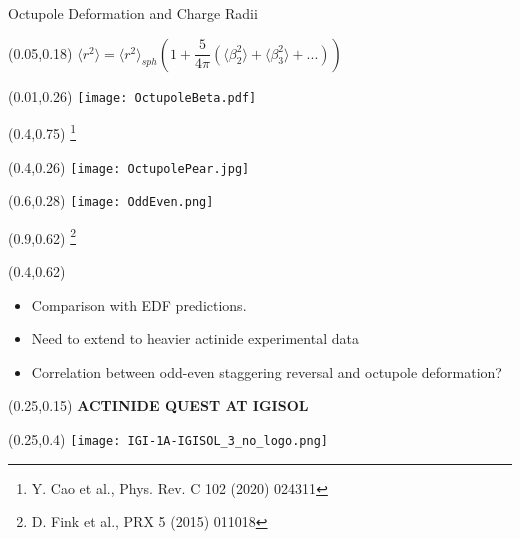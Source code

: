 \documentclass[10pt,aspectratio=169]{beamer}
\begin{document}
\begin{frame}{Octupole Deformation and Charge Radii}
	\begin{textblock*}{0.9\paperwidth}(0.05\paperwidth,0.18\paperheight)
		\centering
		$\langle r^2 \rangle = \langle r^2 \rangle_{sph} \left( 1+\dfrac{5}{4 \pi}\left( \langle \beta^2_2\rangle+\langle \beta^2_3\rangle+...\right)\right)$
	\end{textblock*}
	\begin{textblock*}{0.4\paperwidth}(0.01\paperwidth,0.26\paperheight)
		\texttt{[image: OctupoleBeta.pdf]}
	\end{textblock*}
	\begin{textblock*}{0.1\paperwidth}(0.4\paperwidth,0.75\paperheight)
		\footnote{Y. Cao et al., Phys. Rev. C 102 (2020) 024311}
	\end{textblock*}
	\begin{textblock*}{0.15\paperwidth}(0.4\paperwidth,0.26\paperheight)
		\texttt{[image: OctupolePear.jpg]}
	\end{textblock*}
	\begin{textblock*}{0.4\paperwidth}(0.6\paperwidth,0.28\paperheight)
		\texttt{[image: OddEven.png]}
	\end{textblock*}
	\begin{textblock*}{0.1\paperwidth}(0.9\paperwidth,0.62\paperheight)
		\footnote{D. Fink et al., PRX 5 (2015) 011018}
	\end{textblock*}
	\begin{textblock*}{0.6\paperwidth}(0.4\paperwidth,0.62\paperheight)
		\small	
		\begin{itemize}
				\item Comparison with EDF predictions. 
				\item Need to extend to heavier actinide experimental data
				\item Correlation between odd-even staggering reversal and octupole deformation?
			\end{itemize}
	\end{textblock*}
\end{frame}


\begin{SectionTitle}
	\begin{frame}
		\centering
		\begin{textblock*}{0.5\paperwidth}(0.25\paperwidth,0.15\paperheight)
			\centering
			\textbf{\LARGE ACTINIDE QUEST AT IGISOL}	
		\end{textblock*}
		\begin{textblock*}{0.5\paperwidth}(0.25\paperwidth,0.4\paperheight)
			\texttt{[image: IGI-1A-IGISOL\_3\_no\_logo.png]}
		\end{textblock*}
	\end{frame}
\end{SectionTitle}
	
\end{document}
